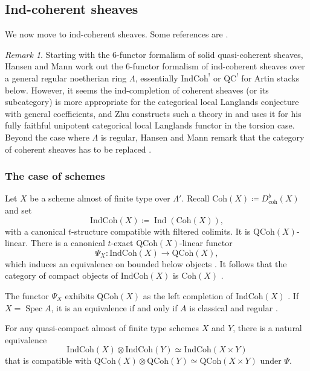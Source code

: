\documentclass{amsart}
\theoremstyle{definition}
\theoremstyle{remark}
\newtheorem{remark}[theorem]{Remark}
\numberwithin{equation}{section}
\DeclareMathOperator{\Spec}{Spec}
\DeclareMathOperator{\Ind}{Ind}
\newcommand{\IndCoh}{\mathrm{IndCoh}}
\newcommand{\QCoh}{\mathrm{QCoh}}
\newcommand{\Coh}{\mathrm{Coh}}
\newcommand{\coh}{\mathrm{coh}}
\begin{document}
\subsection{Ind-coherent sheaves}
We now move to ind-coherent sheaves. Some references are \cite{GaitsgoryIndCohSheaves, GRI, DrinfeldGaitsgory, ArinkinGaitsgory, Preygel, ZhuTame,HansenMann}. 

\begin{remark}
Starting with the 6-functor formalism of solid quasi-coherent sheaves, Hansen and Mann \cite[\S 2.9]{HansenMann} work out the 6-functor formalism of ind-coherent sheaves over a general regular noetherian ring $\Lambda$, essentially $\IndCoh^!$ or $\mathrm{QC}^!$ for Artin stacks below. However, it seems the ind-completion of coherent sheaves (or its subcategory) is more appropriate for the categorical local Langlands conjecture with general coefficients, and Zhu constructs such a theory in \cite[\S 9.3]{ZhuTame} and uses it for his fully faithful unipotent categorical local Langlands functor in the torsion case. Beyond the case where $\Lambda$ is regular, Hansen and Mann remark that the category of coherent sheaves has to be replaced \cite[Remark 2.8.5]{HansenMann}.
\end{remark}

\subsubsection{The case of schemes}\label{ss: indcoh for schemes}
Let $X$ be a scheme almost of finite type over $\Lambda'$. Recall $\Coh(X)\coloneq D_{\coh}^b (X)$ and set 
\[
\IndCoh(X)\coloneq \Ind(\Coh (X)),  
\]
with a canonical $t$-structure compatible with filtered colimits. It is $\QCoh (X)$-linear. 
There is a canonical $t$-exact $\QCoh (X)$-linear functor
\[
\Psi_X\colon \IndCoh(X)\to \QCoh (X),  
\]
which induces an equivalence on bounded below objects \cite[Proposition 1.2.4]{GaitsgoryIndCohSheaves}. It follows that the category of compact objects of $\IndCoh(X)$ is $\Coh(X)$ \cite[Corollary 1.2.6]{GaitsgoryIndCohSheaves}. 

The functor $\Psi_X$ exhibits $\QCoh(X)$ as the left completion of $\IndCoh(X)$ \cite[Proposition 1.3.4]{GaitsgoryIndCohSheaves}. If $X=\Spec A$, it is an equivalence if and only if $A$ is classical and regular \cite[Lemma 1.1.6, Proposition 1.6.4]{GaitsgoryIndCohSheaves}. 

For any quasi-compact almost of finite type schemes $X$ and $Y$, there is a natural equivalence
\[
\IndCoh(X)\otimes\IndCoh(Y) \simeq \IndCoh(X\times Y)
\]
that is compatible with $\QCoh(X)\otimes\QCoh(Y) \simeq \QCoh(X\times Y)$ under $\Psi$. 
\end{document}
